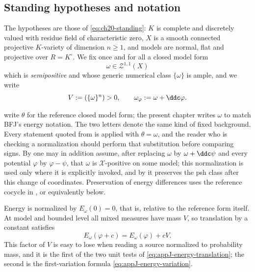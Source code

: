 \subsection{Standing hypotheses and notation}
\label{sec:ch26-hypotheses}

The hypotheses are those of \eqref{eq:ch20-standing}: $K$ is complete and
discretely valued with residue field of characteristic zero, $X$ is a
smooth connected projective $K$-variety of dimension $n\geq1$, and models
are normal, flat and projective over $R=K^\circ$.  We fix once and for all a
closed model form
\[
 \omega\in\mathcal Z^{1,1}(X)
\]
which is \emph{semipositive} and whose generic numerical class $\{\omega\}$
is ample, and we write
\begin{equation}
\label{eq:ch26-standing-notation}
 V:=(\{\omega\}^n)>0,
 \qquad
 \omega_\varphi:=\omega+\ddc\varphi .
\end{equation}

\begin{remark}
\label{rem:ch26-omega-theta}
 write $\theta$ for the
reference closed model form; the present chapter writes $\omega$ to match
BFJ's energy notation.  The two letters denote the same kind of fixed
background.  Every statement quoted from
 is applied with $\theta=\omega$, and
the reader who is checking a normalization should perform that substitution
before comparing signs.  By  one may
in addition assume, after replacing $\omega$ by $\omega+\ddc\psi$ and
every potential $\varphi$ by $\varphi-\psi$, that $\omega$ is
$\mathcal X$-positive on some model; this normalization is used only where
it is explicitly invoked, and by
 it preserves the psh class after this
change of coordinates.  Preservation of energy differences uses the
reference cocycle in , or equivalently
 below.
\end{remark}

Energy is normalized by $E_\omega(0)=0$, that is, relative to the reference
form itself.  At model and bounded level all mixed measures have mass $V$, so
translation by a constant satisfies
\begin{equation}
\label{eq:bfj-energy-translation}
                    E_\omega(\varphi+c)=E_\omega(\varphi)+cV .
\end{equation}
This factor of $V$ is easy to lose when reading a source normalized to
probability mass, and it is the first of the two unit tests of
\eqref{eq:appJ-energy-translation}; the second is the first-variation formula
\eqref{eq:appJ-energy-variation}.


